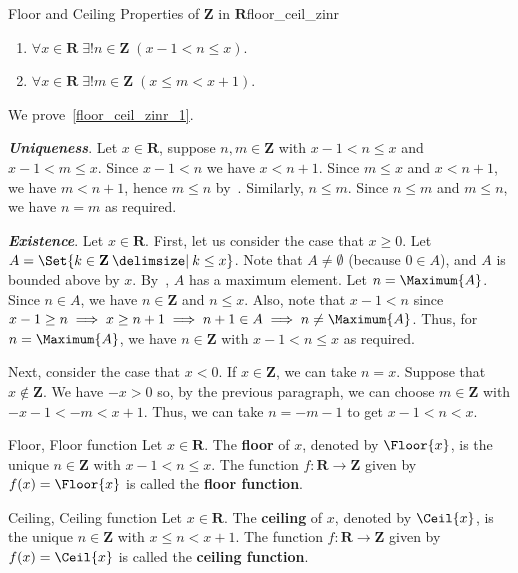 \begin{Theorem}{Floor and Ceiling Properties of $ \mathbf{Z} $ in $ \mathbf{R} $}{floor_ceil_zinr}
    \begin{enumerate}[label=(\arabic*)]
        \item\label{floor_ceil_zinr_1}$ \forall x\in\mathbf{R}\;\exists! n\in\mathbf{Z}\;(x-1<n\le x) $.
        \item\label{floor_ceil_zinr_2}$ \forall x\in\mathbf{R}\;\exists! m\in\mathbf{Z}\;(x\le m<x+1) $.
    \end{enumerate}
\end{Theorem}
\begin{Proof}{}{}
    We prove~\ref{floor_ceil_zinr_1}.

    \emph{\textbf{Uniqueness}}. Let $ x\in\mathbf{R} $,
    suppose $ n,m\in\mathbf{Z} $ with $ x-1<n\le x $ and
    $ x-1<m\le x $. Since $ x-1<n $ we have $ x<n+1 $.
    Since $ m\le x $ and $ x<n+1 $, we have $ m<n+1 $,
    hence $ m\le n $ by~. Similarly,
    $ n\le m $. Since $ n\le m $ and $ m\le n $, we have $ n=m $
    as required.

    \emph{\textbf{Existence}}. Let $ x\in\mathbf{R} $. First, let us
    consider the case that $ x\ge 0 $. Let $ A=\Set{k\in\mathbf{Z}\given k\le x} $.
    Note that $ A\ne \emptyset $ (because $ 0\in A $), and $ A $ is bounded
    above by $ x $. By~, $ A $ has a maximum
    element. Let $ n=\Maximum{A} $. Since $ n\in A $, we have
    $ n\in\mathbf{Z} $ and $ n\le x $. Also, note that $ x-1<n $
    since $ x-1\ge n\implies x\ge n+1\implies n+1\in A\implies
        n\ne \Maximum{A} $. Thus, for $ n=\Maximum{A} $, we have $ n\in\mathbf{Z} $
    with $ x-1<n\le x $ as required.

    Next, consider the case that $ x<0 $. If $ x\in\mathbf{Z} $,
    we can take $ n=x $. Suppose that $ x\notin \mathbf{Z} $.
    We have $ -x>0 $ so, by the previous paragraph, we can choose
    $ m\in\mathbf{Z} $ with $ -x-1<-m<x+1 $. Thus, we can take
    $ n=-m-1 $ to get $ x-1<n<x $.
\end{Proof}
\begin{Definition}{Floor, Floor function}{}
    Let $ x\in\mathbf{R} $. The \textbf{floor} of $ x $,
    denoted by $ \Floor{x} $, is the unique $ n\in\mathbf{Z} $
    with $ x-1<n\le x $. The function $ f:\mathbf{R}\to\mathbf{Z} $
    given by $ f(x)=\Floor{x} $ is called the \textbf{floor function}.
\end{Definition}
\begin{Definition}{Ceiling, Ceiling function}{}
    Let $ x\in\mathbf{R} $. The \textbf{ceiling} of $ x $,
    denoted by $ \Ceil{x} $, is the unique $ n\in\mathbf{Z} $
    with $ x\le n<x+1 $. The function $ f:\mathbf{R}\to\mathbf{Z} $
    given by $ f(x)=\Ceil{x} $ is called the \textbf{ceiling function}.
\end{Definition}

